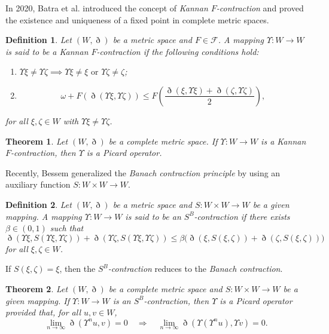 \documentclass[pdflatex,sn-mathphys-num]{sn-jnl}%
\theoremstyle{thmstyleone}%
\newtheorem{theorem}{Theorem}%
\theoremstyle{thmstyletwo}%
\theoremstyle{thmstylethree}%
\newtheorem{definition}{Definition}%
\begin{document}
In 2020, Batra et al. \cite{batra} introduced the concept of \textit{Kannan $F$-contraction} and proved the existence and uniqueness of a fixed point in complete metric spaces.

\begin{definition}
Let $(W,\eth)$ be a metric space and $F \in \mathcal{F}$. 
A mapping $\Upsilon :W\to W$ is said to be a \emph{\textit{Kannan $F$-contraction}} if the following conditions hold:
\begin{enumerate}
    \item[(i)] $\Upsilon \xi \neq \Upsilon \zeta \implies \Upsilon \xi  \neq \xi \text{ or } \Upsilon \zeta \neq \zeta$;
    \item[(ii)] 
    \[
    \omega   + F\left(\eth(\Upsilon \xi,\Upsilon \zeta)\right)
    \le 
    F\left(\frac{\eth(\xi,\Upsilon \xi )+\eth(\zeta ,\Upsilon \zeta)}{2}\right),
    \]
\end{enumerate}
for all $\xi,\zeta \in W$ with $\Upsilon \xi \neq \Upsilon \zeta$.
\end{definition}

\begin{theorem}\cite{batra}
Let $(W,\eth)$ be a complete metric space. 
If $\Upsilon :W\to W$ is a \textit{Kannan $F$-contraction}, then $\Upsilon $ is a \textit{Picard operator}.
\end{theorem}

Recently, Bessem \cite{bessem} generalized the \textit{Banach contraction principle} by using an auxiliary function $S:W \times W \to W$.

\begin{definition}\label{sb definition}\cite{bessem}
Let $(W,\eth)$ be a metric space and $S:W\times W \to W$ be a given mapping. 
A mapping $\Upsilon : W \to W$ is said to be an $S^B$-contraction if there exists $\beta \in (0,1)$ such that
\begin{equation}\label{sb contraction}
\eth(\Upsilon \xi,S(\Upsilon \xi,\Upsilon \zeta)) + \eth(\Upsilon \zeta,S(\Upsilon \xi,\Upsilon \zeta)) 
\le 
\beta \big(\eth(\xi,S(\xi,\zeta)) + \eth(\zeta ,S(\xi,\zeta))\big)
\end{equation}
for all $\xi,\zeta \in W$.
\end{definition}

If $S(\xi,\zeta)=\xi$, then the \textit{$S^B$-contraction} reduces to the \textit{Banach contraction}.

\begin{theorem}\cite{bessem}
Let $(W,\eth)$ be a complete metric space and $S:W\times W \to W$ be a given mapping. 
If $\Upsilon  : W \to W$ is an \textit{$S^B$-contraction}, then $\Upsilon $ is a \textit{Picard operator} provided that, for all $u,v \in W$,
\[
\lim_{n \to \infty} \eth(\Upsilon^n u, v) = 0 
\quad \Longrightarrow \quad 
\lim_{n \to \infty} \eth(\Upsilon(\Upsilon^n u), \Upsilon  v) = 0.
\]
\end{theorem}
\end{document}
